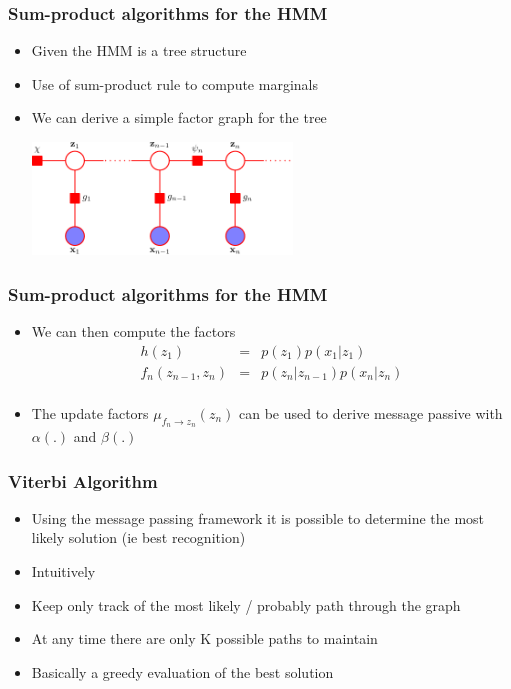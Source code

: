 \documentclass[10pt]{beamer}
\begin{document}
\begin{frame}
  \frametitle{Sum-product algorithms for the HMM}
  \begin{itemize}
  \item Given the HMM is a tree structure
  \item Use of sum-product rule to compute marginals
  \item We can derive a simple factor graph for the tree
    \begin{center}
      \includegraphics[height=3cm]{prml-Figure13-14}
    \end{center}
  \end{itemize}
\end{frame}

\begin{frame}
  \frametitle{Sum-product algorithms for the HMM}
  \begin{itemize}
  \item We can then compute the factors
    \begin{eqnarray*}
      h(z_1) &=& p(z_1) p(x_1 | z_1)\\
      f_n(z_{n-1}, z_n) &=& p(z_n|z_{n-1}) p(x_n|z_n)\\
    \end{eqnarray*}
  \item The update factors $\mu_{f_n \rightarrow z_n}(z_n)$ can be
    used to derive message passive with $\alpha(.)$ and $\beta(.)$
  \end{itemize}
\end{frame}

\begin{frame}
  \frametitle{Viterbi Algorithm}
  \begin{itemize}
  \item Using the message passing framework it is possible to
    determine the most likely solution (ie best recognition)
  \item Intuitively
  \item Keep only track of the most likely / probably path through the
    graph
  \item At any time there are only K possible paths to maintain
  \item Basically a greedy evaluation of the best solution
  \end{itemize}
\end{frame}
\end{document}
